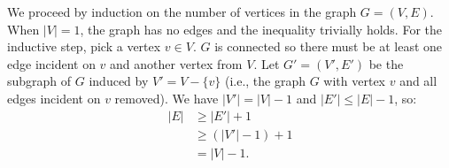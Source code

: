 \exercise
We proceed by induction on the number of vertices in the graph $G=(V,E)$.
When $|V|=1$, the graph has no edges and the inequality trivially holds.
For the inductive step, pick a vertex $v\in V$.
$G$ is connected so there must be at least one edge incident on $v$ and another vertex from $V$.
Let $G'=(V',E')$ be the subgraph of $G$ induced by $V'=V-\{v\}$ (i.e., the graph $G$ with vertex $v$ and all edges incident on $v$ removed).
We have $|V'|=|V|-1$ and $|E'|\le |E|-1$, so:
\begin{align*}
    |E| &\ge |E'|+1 \\
    &\ge (|V'|-1)+1 \tag{by the inductive hypothesis applied for $G'$} \\
    &= |V|-1.
\end{align*}
